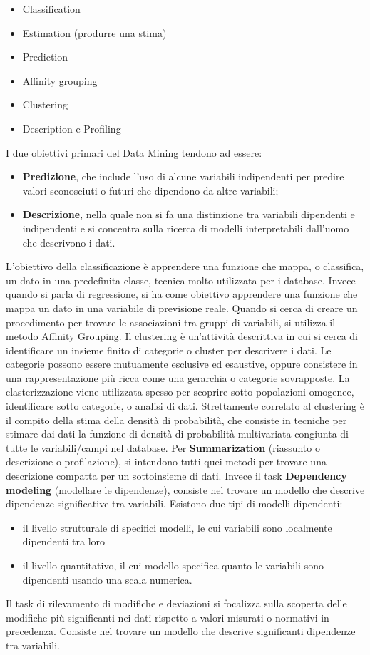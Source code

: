 \documentclass[a4paper]{extarticle}
\begin{document}
\begin{itemize}
\item Classification
\item Estimation (produrre una stima)
\item Prediction
\item Affinity grouping
\item Clustering
\item Description e Profiling
\end{itemize}

I due obiettivi primari del Data Mining tendono ad essere:

\begin{itemize}
\item \textbf{Predizione}, che include l'uso di alcune variabili indipendenti per predire valori sconosciuti o futuri che dipendono da altre variabili;
\item \textbf{Descrizione}, nella quale non si fa una distinzione tra variabili dipendenti e indipendenti e si concentra sulla ricerca di modelli interpretabili dall'uomo che descrivono i dati.
\end{itemize}

L'obiettivo della classificazione è apprendere una funzione che mappa, o classifica, un dato in una predefinita classe, tecnica molto utilizzata per i database. Invece quando si parla di regressione, si ha come obiettivo apprendere una funzione che mappa un dato in una variabile di previsione reale. Quando  si cerca di creare un procedimento per trovare le associazioni tra gruppi di variabili, si utilizza il metodo Affinity Grouping. Il clustering è un'attività descrittiva in cui si cerca di identificare un insieme finito di categorie o cluster per descrivere i dati. Le categorie possono essere mutuamente esclusive ed esaustive, oppure consistere in una rappresentazione più ricca come una gerarchia o categorie sovrapposte. La clasterizzazione viene utilizzata spesso per scoprire sotto-popolazioni omogenee, identificare sotto categorie, o analisi di dati. Strettamente correlato al clustering è il compito della stima della densità di probabilità, che consiste in tecniche per stimare dai dati la funzione di densità di probabilità multivariata congiunta di tutte le variabili/campi nel database.
Per \textbf{Summarization} (riassunto o descrizione o profilazione), si intendono tutti quei metodi per trovare una descrizione compatta per un sottoinsieme di dati. Invece il task \textbf{Dependency modeling} (modellare le dipendenze), consiste nel trovare un modello che descrive dipendenze significative tra variabili. Esistono due tipi di modelli dipendenti:
\begin{itemize}
\item il livello strutturale di specifici modelli, le cui variabili sono localmente dipendenti tra loro
\item il livello quantitativo, il cui modello specifica quanto le variabili sono dipendenti usando una scala numerica.
\end{itemize}
Il task di rilevamento di modifiche e deviazioni si focalizza sulla scoperta delle modifiche più significanti nei dati rispetto a valori misurati o normativi in precedenza. Consiste nel trovare un modello che descrive significanti dipendenze tra variabili.
\end{document}
